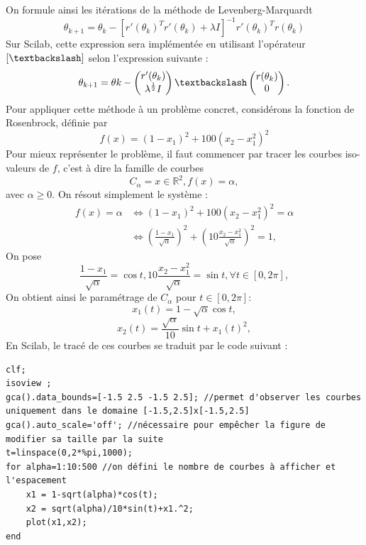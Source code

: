       On formule ainsi les itérations de la méthode de Levenberg-Marquardt
      $$
      \theta_{k+1} = \theta_k - [r'(\theta_k)^Tr'(\theta_k)+\lambda I]^{-1}r'(\theta_k)^Tr(\theta_k)
      $$
      Sur Scilab, cette expression sera implémentée en utilisant l'opérateur $[\textbackslash]$ selon l'expression suivante : 
      $$
      \theta_{k+1} = \theta{k} - \begin{pmatrix}
          r'(\theta_k)\\ \lambda^{\frac{1}{2}}I
      \end{pmatrix}\textbackslash \begin{pmatrix}
          r(\theta_k)\\0
      \end{pmatrix}.
      $$
      Pour appliquer cette méthode à un problème concret, considérons la fonction de Rosenbrock, définie par
      $$f(x)=(1-x_1)^2+100(x_2-x_1^2)^2$$
      Pour mieux représenter le problème, il faut commencer par tracer les courbes iso-valeurs de $f$, c'est à dire la famille de courbes 
      $$C_\alpha = {x\in \mathbb{R}^2, f(x) = \alpha},$$
      avec $\alpha \geq 0$.
      On résout simplement le système : 
      \begin{align*}
          f(x) = \alpha &\Leftrightarrow (1-x_1)^2+100(x_2-x_1^2)^2=\alpha\\
          &\Leftrightarrow(\frac{1-x_1}{\sqrt{\alpha}})^2+(10\frac{x_2-x_1^2}{\sqrt{\alpha}})^2=1,
      \end{align*}
      On pose $$
      \frac{1-x_1}{\sqrt{\alpha}} = \cos{t}, 10\frac{x_2-x_1^2}{\sqrt{\alpha}}=\sin{t}, \forall t \in [0,2\pi],
      $$
      On obtient ainsi le paramétrage de $C_\alpha$ pour $t\in [0,2\pi]$: 
      $$
      x_1(t) = 1 - \sqrt{\alpha}\cos{t},
      $$
      $$
      x_2(t) = \frac{\sqrt{\alpha}}{10}\sin{t}+x_1(t)^2,
      $$
      En Scilab, le tracé de ces courbes se traduit par le code suivant : 
      \begin{center}
          \begin{verbatim}
clf;
isoview ;
gca().data_bounds=[-1.5 2.5 -1.5 2.5]; //permet d'observer les courbes uniquement dans le domaine [-1.5,2.5]x[-1.5,2.5]
gca().auto_scale='off'; //nécessaire pour empêcher la figure de modifier sa taille par la suite
t=linspace(0,2*%pi,1000);
for alpha=1:10:500 //on défini le nombre de courbes à afficher et l'espacement
    x1 = 1-sqrt(alpha)*cos(t);
    x2 = sqrt(alpha)/10*sin(t)+x1.^2;
    plot(x1,x2);
end
          \end{verbatim}
                \label{lst:code_12}
         \end{center}
